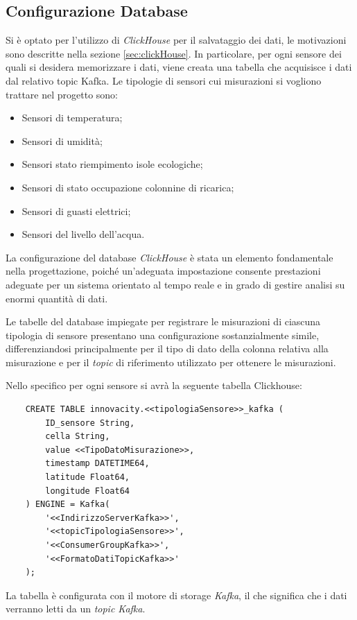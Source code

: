 \subsection{Configurazione Database}
Si è optato per l'utilizzo di \textit{ClickHouse} per il salvataggio dei dati, le motivazioni sono descritte nella sezione \ref{sec:clickHouse}. In particolare, per ogni sensore dei quali si desidera memorizzare i dati, viene creata una tabella che acquisisce i dati dal relativo topic Kafka.
Le tipologie di sensori cui misurazioni si vogliono trattare nel progetto sono:
\begin{itemize}
    \item Sensori di temperatura;
    \item Sensori di umidità;
    \item Sensori stato riempimento isole ecologiche;
    \item Sensori di stato occupazione colonnine di ricarica;
    \item Sensori di guasti elettrici;
    \item Sensori del livello dell'acqua.
\end{itemize}

La configurazione del database \textit{ClickHouse} è stata un elemento fondamentale nella progettazione, poiché un'adeguata impostazione consente prestazioni adeguate per un sistema orientato al tempo reale e in grado di gestire analisi su enormi quantità di dati.

\vspace{0.1cm}
Le tabelle del database impiegate per registrare le misurazioni di ciascuna tipologia di sensore presentano una configurazione sostanzialmente simile, differenziandosi principalmente per il tipo di dato della colonna relativa alla misurazione e per il \textit{topic} di riferimento utilizzato per ottenere le misurazioni.

Nello specifico per ogni sensore si avrà la seguente tabella Clickhouse:
\begin{verbatim}
    CREATE TABLE innovacity.<<tipologiaSensore>>_kafka (
        ID_sensore String,
        cella String,
        value <<TipoDatoMisurazione>>,
        timestamp DATETIME64,
        latitude Float64,
        longitude Float64
    ) ENGINE = Kafka(
        '<<IndirizzoServerKafka>>',
        '<<topicTipologiaSensore>>',
        '<<ConsumerGroupKafka>>',
        '<<FormatoDatiTopicKafka>>'
    );
    \end{verbatim}

    La tabella è configurata con il motore di storage \textit{Kafka}, il che significa che i dati verranno letti da un \textit{topic Kafka}. 


